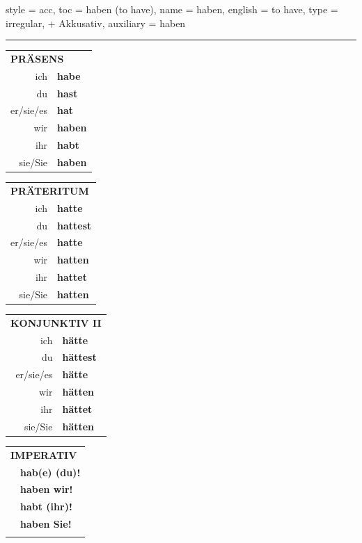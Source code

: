 \begin{verbentry}{
  style = {acc},
  toc = {haben (to have)},
  name = {haben},
  english = {to have},
  type = {irregular, + Akkusativ},
  auxiliary = {haben}
}
 
     \vspace{5pt}
    \hrule
    \vspace{5pt}
  \begin{tabular}{rl}
     \multicolumn{2}{l}{\textbf{PRÄSENS} }\\
    ich & \textbf{habe}\\
    du & \textbf{hast}\\
    er/sie/es & \textbf{hat}\\
    wir & \textbf{haben}\\
    ihr & \textbf{habt}\\
    sie/Sie & \textbf{haben}\\
  \end{tabular}
  \hfill
     \begin{tabular}{rl}
    \multicolumn{2}{l}{\textbf{PRÄTERITUM} }\\
    ich & \textbf{hatte}\\
    du & \textbf{hattest}\\
    er/sie/es & \textbf{hatte}\\
    wir & \textbf{hatten}\\
    ihr & \textbf{hattet}\\
    sie/Sie & \textbf{hatten}\\
  \end{tabular}
  \hfill
       \begin{tabular}{rl}
    \multicolumn{2}{l}{\textbf{KONJUNKTIV II} }\\
    ich & \textbf{hätte}\\
    du & \textbf{hättest}\\
    er/sie/es & \textbf{hätte}\\
    wir & \textbf{hätten}\\
    ihr & \textbf{hättet}\\
    sie/Sie & \textbf{hätten}\\
  \end{tabular}
  \hfill
  \begin{tabular}{rl}
     \multicolumn{2}{l}{\textbf{IMPERATIV} }\\
   & \textbf{hab(e) (du)!}\\
   & \textbf{haben wir!}\\
   & \textbf{habt (ihr)!}\\
   & \textbf{haben Sie!}\\
   & \vspace{10pt}
  \end{tabular}


\end{verbentry}

